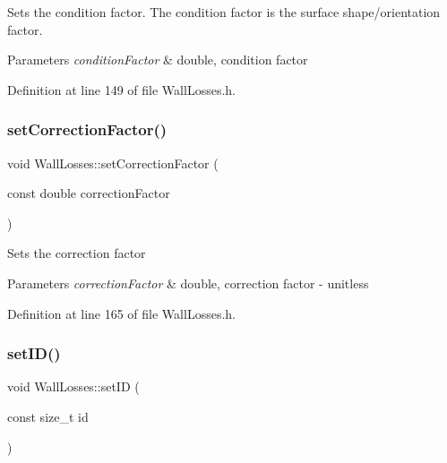Sets the condition factor. The condition factor is the surface shape/orientation factor. 
\begin{DoxyParams}{Parameters}
{\em condition\+Factor} & double, condition factor \\
\hline
\end{DoxyParams}


Definition at line 149 of file Wall\+Losses.\+h.

\mbox{\label{class_wall_losses_affdf3f6c3d54d73c7f91e1515fb12533}} 
\subsubsection{\texorpdfstring{set\+Correction\+Factor()}{setCorrectionFactor()}}
{\footnotesize\ttfamily void Wall\+Losses\+::set\+Correction\+Factor (\begin{DoxyParamCaption}\item[{const double}]{correction\+Factor }\end{DoxyParamCaption})\hspace{0.3cm}{\ttfamily [inline]}}

Sets the correction factor 
\begin{DoxyParams}{Parameters}
{\em correction\+Factor} & double, correction factor -\/ unitless \\
\hline
\end{DoxyParams}


Definition at line 165 of file Wall\+Losses.\+h.

\mbox{\label{class_wall_losses_a91526efc0eb1bf030ebc1d864a21acdd}} 
\subsubsection{\texorpdfstring{set\+I\+D()}{setID()}}
{\footnotesize\ttfamily void Wall\+Losses\+::set\+ID (\begin{DoxyParamCaption}\item[{const size\+\_\+t}]{id }\end{DoxyParamCaption})\hspace{0.3cm}{\ttfamily [inline]}}


